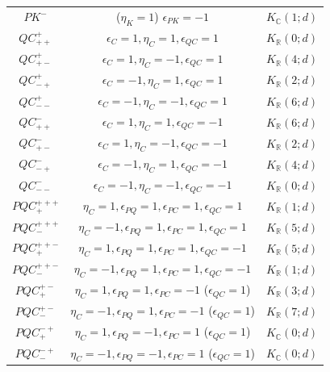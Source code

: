 \documentclass{tADP2e}
\theoremstyle{plain}
\theoremstyle{plain}
\theoremstyle{definition}
\begin{document}
\begin{table}[tbp]
\begin{center}
\begin{tabular}{ccc}
$PK^-$ & %
($\eta_K=1$) $\epsilon_{PK}=-1$ & $K_\mathbb{C}(1;d)$ \\
$QC^+_{++}$ & %
$\epsilon_C=1,\eta_C=1,\epsilon_{QC}=1$ & $K_\mathbb{R}(0;d)$ \\
$QC^+_{+-}$ & %
$\epsilon_C=1,\eta_C=-1,\epsilon_{QC}=1$ & $K_\mathbb{R}(4;d)$ \\
$QC^+_{-+}$ & %
$\epsilon_C=-1,\eta_C=1,\epsilon_{QC}=1$ & $K_\mathbb{R}(2;d)$ \\
$QC^+_{--}$ & %
$\epsilon_C=-1,\eta_C=-1,\epsilon_{QC}=1$ & $K_\mathbb{R}(6;d)$ \\
$QC^-_{++}$ & %
$\epsilon_C=1,\eta_C=1,\epsilon_{QC}=-1$ & $K_\mathbb{R}(6;d)$ \\
$QC^-_{+-}$ & %
$\epsilon_C=1,\eta_C=-1,\epsilon_{QC}=-1$ & $K_\mathbb{R}(2;d)$ \\
$QC^-_{-+}$ & %
$\epsilon_C=-1,\eta_C=1,\epsilon_{QC}=-1$ & $K_\mathbb{R}(4;d)$ \\
$QC^-_{--}$ & %
$\epsilon_C=-1,\eta_C=-1,\epsilon_{QC}=-1$ & $K_\mathbb{R}(0;d)$ \\
$PQC^{+++}_+$ & %
$\eta_C=1,\epsilon_{PQ}=1,\epsilon_{PC}=1,\epsilon_{QC}=1$ & $K_\mathbb{R}(1;d)$ \\
$PQC^{+++}_-$ & %
$\eta_C=-1,\epsilon_{PQ}=1,\epsilon_{PC}=1,\epsilon_{QC}=1$ & $K_\mathbb{R}(5;d)$ \\
$PQC^{++-}_+$ & %
$\eta_C=1,\epsilon_{PQ}=1,\epsilon_{PC}=1,\epsilon_{QC}=-1$ & $K_\mathbb{R}(5;d)$ \\
$PQC^{++-}_-$ & %
$\eta_C=-1,\epsilon_{PQ}=1,\epsilon_{PC}=1,\epsilon_{QC}=-1$ & $K_\mathbb{R}(1;d)$ \\
$PQC^{+-}_+$ & %
$\eta_C=1,\epsilon_{PQ}=1,\epsilon_{PC}=-1$ ($\epsilon_{QC}=1$) & $K_\mathbb{R}(3;d)$ \\
$PQC^{+-}_-$ & %
$\eta_C=-1,\epsilon_{PQ}=1,\epsilon_{PC}=-1$ ($\epsilon_{QC}=1$) & $K_\mathbb{R}(7;d)$ \\
$PQC^{-+}_+$ & %
$\eta_C=1,\epsilon_{PQ}=-1,\epsilon_{PC}=1$ ($\epsilon_{QC}=1$) & $K_\mathbb{C}(0;d)$ \\
$PQC^{-+}_-$ & %
$\eta_C=-1,\epsilon_{PQ}=-1,\epsilon_{PC}=1$ ($\epsilon_{QC}=1$) & $K_\mathbb{C}(0;d)$  \\

\end{tabular}
\end{center}
\end{table}
\end{document}
